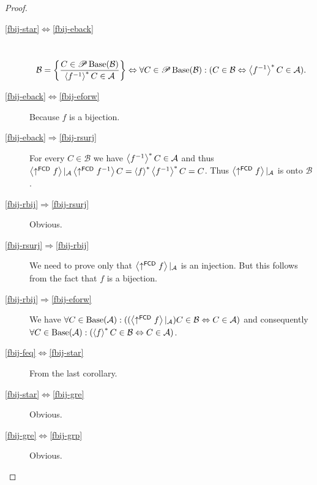 \begin{proof}
~
\begin{description}
\item [{\ref{fbij-star}$\Leftrightarrow$\ref{fbij-eback}}] ~
\[
\mathcal{B}=\left\{ \frac{C\in\mathscr{P}\operatorname{Base}(\mathcal{B})}{\left\langle f^{-1}\right\rangle ^{\ast}C\in\mathcal{A}}\right\}\Leftrightarrow\\
\forall C\in\mathscr{P}\operatorname{Base}(\mathcal{B}):(C\in\mathcal{B}\Leftrightarrow\left\langle f^{-1}\right\rangle ^{\ast}C\in\mathcal{A}).
\]

\item [{\ref{fbij-eback}$\Leftrightarrow$\ref{fbij-eforw}}] Because
$f$ is a bijection.
\item [{\ref{fbij-eback}$\Rightarrow$\ref{fbij-rsurj}}] For every $C\in\mathcal{B}$
we have $\left\langle f^{-1}\right\rangle ^{\ast}C\in\mathcal{A}$ and thus $\left\langle \uparrow^{\mathsf{FCD}}f\right\rangle|_{\mathcal{A}}\left\langle \uparrow^{\mathsf{FCD}}f^{-1}\right\rangle C=\left\langle f\right\rangle ^{\ast}\left\langle f^{-1}\right\rangle ^{\ast}C=C$.
Thus $\left\langle \uparrow^{\mathsf{FCD}}f\right\rangle|_{\mathcal{A}}$ is onto $\mathcal{B}$.
\item [{\ref{fbij-rbij}$\Rightarrow$\ref{fbij-rsurj}}] Obvious.
\item [{\ref{fbij-rsurj}$\Rightarrow$\ref{fbij-rbij}}] We need to prove
only that $\left\langle \uparrow^{\mathsf{FCD}}f\right\rangle|_{\mathcal{A}}$ is an
injection. But this follows from the fact that $f$ is a bijection.
\item [{\ref{fbij-rbij}$\Rightarrow$\ref{fbij-eforw}}] We have $\forall C\in\operatorname{Base}(\mathcal{A}):((\left\langle \uparrow^{\mathsf{FCD}}f\right\rangle|_{\mathcal{A}})C\in\mathcal{B}\Leftrightarrow C\in\mathcal{A})$
and consequently $\forall C\in\operatorname{Base}(\mathcal{A}):(\left\langle f\right\rangle ^{\ast}C\in\mathcal{B}\Leftrightarrow C\in\mathcal{A})$.
\item [{\ref{fbij-feq}$\Leftrightarrow$\ref{fbij-star}}] From the last
corollary.
\item [{\ref{fbij-star}$\Leftrightarrow$\ref{fbij-gre}}] Obvious.
\item [{\ref{fbij-gre}$\Leftrightarrow$\ref{fbij-grp}}] Obvious.
\end{description}
\end{proof}
